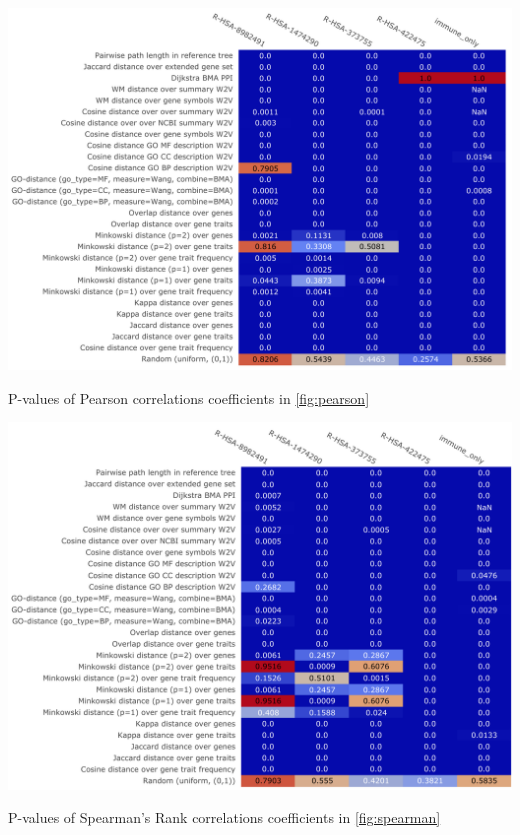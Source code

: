 \documentclass{thesisclass}
\begin{document}
\begin{centeredFigure}[!ht]
	\includegraphics[scale=0.65]{figures/results/plots/summary/pearsonr_pval.pdf}%
	\caption{P-values of Pearson correlations coefficients in \cref{fig:pearson}}
	\label{fig:pval_pearson}
\end{centeredFigure}

\begin{centeredFigure}[!ht]
	\includegraphics[scale=0.65]{figures/results/plots/summary/spearmanr_pval.pdf}%
	\caption{P-values of Spearman's Rank correlations coefficients in \cref{fig:spearman}}
	\label{fig:pval_spearman}
\end{centeredFigure}

\newpage
\end{document}
